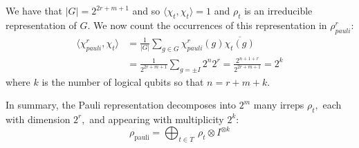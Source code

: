 \documentclass[11pt,oneside]{article}
\def\C{\mathbb{C}}
\def\Pauli{\mathcal{P}}
\def\GL{\mathrm{GL}}
\def\Stab{S}
\begin{document}
We have that $|G|=2^{2r+m+1}$ and so
$\langle\chi_{t},\chi_{t}\rangle = 1$ and
$\rho_t$ is an irreducible representation of $G.$
We now count the occurrences of 
this representation in $\rho^r_{pauli}$:
\begin{align*}
\langle\chi^r_{pauli},\chi_{t}\rangle &= \frac{1}{|G|}\sum_{g\in G} \chi^r_{pauli}(g)\overline{\chi_{t}(g)} \\
&= \frac{1}{2^{2r+m+1}} \sum_{g=\pm I} 2^n 2^r = \frac{2^{n+1+r}}{2^{2r+m+1}} = 2^k
\end{align*}
where $k$ is the number of logical qubits so that $n=r+m+k.$

In summary, the Pauli representation decomposes into 
$2^m$ many irreps $\rho_t,$ 
each with dimension $2^r,$ 
and appearing with multiplicity $2^k:$
$$
    \rho_{\mathrm{pauli}} = 
        \bigoplus_{t\in T}\ \rho_t \otimes I^{\otimes k}
$$

%
%
\end{document}
